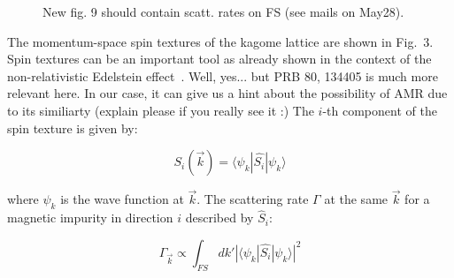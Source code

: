 \documentclass[prb,showpacs,amsmath,amssymb,superscriptaddress,twocolumn,floatfix]{revtex4-1}
\begin{document}

\begin{figure}
\caption{New fig. 9 should contain scatt. rates on FS (see mails on May28).}
\label{fig-09}
\end{figure}

The momentum-space spin textures of the kagome lattice %
are shown in Fig.~3.  %
Spin textures can be an important tool as already shown in the context of the non-relativistic Edelstein effect~\cite{Gonzalez-Hernandez:2024}.
{\color{red}Well, yes... but PRB 80, 134405 is much more relevant here.} In our case, it can give us a hint about the possibility of AMR due to its similiarty
{\color{red}(explain please if you really see it :)} The $i$-th component of the spin texture is given by:

\begin{equation}
	S_i (\vec{k}) = \langle \psi_k | \hat{S_i} | \psi_k \rangle
	\label{eq_spintexture}
\end{equation}

where $\psi_k$ is the wave function at $\vec{k}$. The scattering rate $\Gamma$ at the same $\vec{k}$ for a magnetic impurity in direction $i$ described by $\hat{S}_i$:

\begin{equation}	
	{\Gamma_{\vec{k}}} \propto \int_{FS} dk' |\langle \psi_k |\hat{S_i}|\psi_k \rangle|^2
	\label{eq_FermiGoldenRule_2}
\end{equation}
\end{document}
